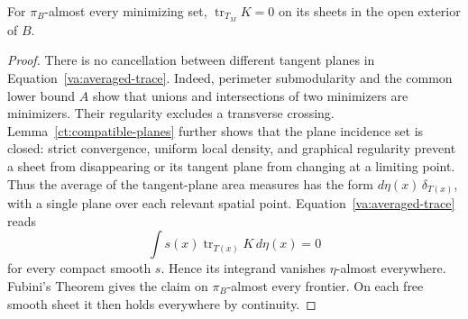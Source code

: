 \begin{lemma}\label{va:trace-support}
For \(\pi_B\)-almost every minimizing set,
\(\operatorname{tr}_{T_M}K=0\) on its sheets in the open exterior of
\(B\).
\end{lemma}
\begin{proof}
There is no cancellation between different tangent planes in
Equation~\eqref{va:averaged-trace}.  Indeed, perimeter submodularity and
the common lower bound \(A\) show that unions and intersections of two
minimizers are minimizers.  Their regularity excludes a transverse
crossing.  Lemma~\ref{ct:compatible-planes} further shows that the plane
incidence set is closed: strict convergence, uniform local density, and
graphical regularity prevent a sheet from disappearing or its tangent
plane from changing at a limiting point.  Thus the average of the
tangent-plane area measures has the form
\(d\eta(x)\,\delta_{T(x)}\), with a single plane over each relevant
spatial point.  Equation~\eqref{va:averaged-trace} reads
\[
 \int s(x)\operatorname{tr}_{T(x)}K\,d\eta(x)=0
\]
for every compact smooth \(s\).  Hence its integrand vanishes
\(\eta\)-almost everywhere.  Fubini's Theorem gives the claim on
\(\pi_B\)-almost every frontier.  On each free smooth sheet it then
holds everywhere by continuity.
\end{proof}

